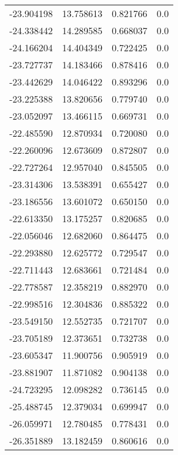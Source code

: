 \begin{tabular}{rrrr}
      -23.904198 &        13.758613 &    0.821766 &   0.0 \\
      -24.338442 &        14.289585 &    0.668037 &   0.0 \\
      -24.166204 &        14.404349 &    0.722425 &   0.0 \\
      -23.727737 &        14.183466 &    0.878416 &   0.0 \\
      -23.442629 &        14.046422 &    0.893296 &   0.0 \\
      -23.225388 &        13.820656 &    0.779740 &   0.0 \\
      -23.052097 &        13.466115 &    0.669731 &   0.0 \\
      -22.485590 &        12.870934 &    0.720080 &   0.0 \\
      -22.260096 &        12.673609 &    0.872807 &   0.0 \\
      -22.727264 &        12.957040 &    0.845505 &   0.0 \\
      -23.314306 &        13.538391 &    0.655427 &   0.0 \\
      -23.186556 &        13.601072 &    0.650150 &   0.0 \\
      -22.613350 &        13.175257 &    0.820685 &   0.0 \\
      -22.056046 &        12.682060 &    0.864475 &   0.0 \\
      -22.293880 &        12.625772 &    0.729547 &   0.0 \\
      -22.711443 &        12.683661 &    0.721484 &   0.0 \\
      -22.778587 &        12.358219 &    0.882970 &   0.0 \\
      -22.998516 &        12.304836 &    0.885322 &   0.0 \\
      -23.549150 &        12.552735 &    0.721707 &   0.0 \\
      -23.705189 &        12.373651 &    0.732738 &   0.0 \\
      -23.605347 &        11.900756 &    0.905919 &   0.0 \\
      -23.881907 &        11.871082 &    0.904138 &   0.0 \\
      -24.723295 &        12.098282 &    0.736145 &   0.0 \\
      -25.488745 &        12.379034 &    0.699947 &   0.0 \\
      -26.059971 &        12.780485 &    0.778431 &   0.0 \\
      -26.351889 &        13.182459 &    0.860616 &   0.0 \\

\end{tabular}
